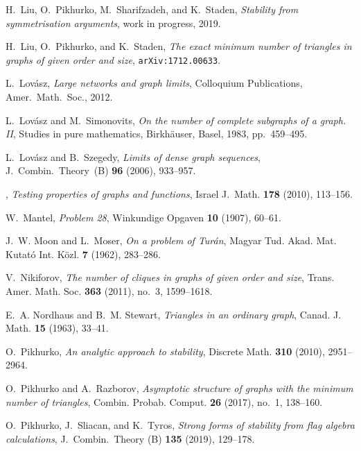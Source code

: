 \documentclass[12pt]{article}
\def\MR#1{}
\theoremstyle{definition}
\theoremstyle{remark}
\begin{document}
\begin{thebibliography}{10}
H.~Liu, O.~Pikhurko, M.~Sharifzadeh, and K.~Staden, \emph{Stability from
  symmetrisation arguments}, work in progress, 2019.

H.~Liu, O.~Pikhurko, and K.~Staden, \emph{The exact minimum number of triangles
  in graphs of given order and size}, \texttt{arXiv:1712.00633}.

L.~{Lov\'asz}, \emph{Large networks and graph limits}, Colloquium Publications,
  Amer.\ Math.\ Soc., 2012.

L.~Lov\'asz and M.~Simonovits, \emph{On the number of complete subgraphs of a
  graph. {II}}, Studies in pure mathematics, Birkh\"auser, Basel, 1983,
  pp.~459--495. \MR{820244}

L.~Lov{\'a}sz and B.~Szegedy, \emph{Limits of dense graph sequences}, J.\
  Combin.\ Theory\ {\rm (B)} \textbf{96} (2006), 933--957.

\bysame, \emph{Testing properties of graphs and functions}, Israel J.\ Math.
  \textbf{178} (2010), 113--156.

W.~Mantel, \emph{Problem 28}, Winkundige Opgaven \textbf{10} (1907), 60--61.

J.~W. Moon and L.~Moser, \emph{On a problem of {T}ur\'an}, Magyar Tud. Akad.
  Mat. Kutat\'o Int. K\"ozl. \textbf{7} (1962), 283--286. \MR{0151955}

V.~Nikiforov, \emph{The number of cliques in graphs of given order and size},
  Trans. Amer. Math. Soc. \textbf{363} (2011), no.~3, 1599--1618. \MR{2737279}

E.~A. Nordhaus and B.~M. Stewart, \emph{Triangles in an ordinary graph}, Canad.
  J. Math. \textbf{15} (1963), 33--41. \MR{0151957}

O.~Pikhurko, \emph{An analytic approach to stability}, Discrete Math.
  \textbf{310} (2010), 2951--2964.

O.~Pikhurko and A.~Razborov, \emph{Asymptotic structure of graphs with the
  minimum number of triangles}, Combin. Probab. Comput. \textbf{26} (2017),
  no.~1, 138--160. \MR{3579594}

O.~Pikhurko, J.~Sliacan, and K.~Tyros, \emph{Strong forms of stability from
  flag algebra calculations}, J.\ Combin.\ Theory (B) \textbf{135} (2019),
  129--178.


\end{thebibliography}
\end{document}
